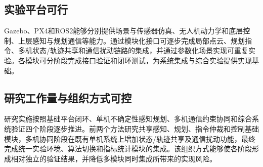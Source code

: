\subsection{实验平台可行}

Gazebo、PX4和ROS2能够分别提供场景与传感器仿真、无人机动力学和底层控制、上层感知与规划通信等能力。通过模块化接口可逐步完成局部点云、规划指令、多机状态/轨迹共享和通信扰动链路的集成，并通过参数化场景实现可重复实验。各模块可分阶段完成接口验证和闭环测试，为系统集成与综合实验提供实现基础。

\subsection{研究工作量与组织方式可控}

研究实施按照基础平台闭环、单机不确定性感知规划、多机通信约束协同和综合系统验证四个阶段逐步推进。前两个方法研究共享感知、规划、指令仲裁和控制基础模块，多机协同阶段在既有单机系统上增加状态/轨迹共享及通信扰动功能，最终完成统一实验环境、算法切换和指标统计模块的集成。该组织方式能够使各阶段形成相对独立的验证结果，并降低多模块同时集成所带来的实现风险。
